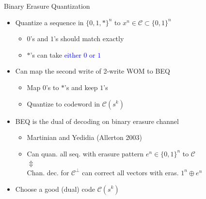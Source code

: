 \documentclass[10pt]{beamer}
\begin{document}
\begin{frame}{Binary Erasure Quantization}
  \begin{itemize}
  \item Quantize a sequence in $\{0,1,*\}^n$ to $x^n \in \mathcal{C} \subset \{0,1\}^n$
    \begin{itemize}
    \item $0$'s and $1$'s should \alert{match exactly}
    \item $*$'s can take \textcolor{blue}{either $0$ or $1$}
    \end{itemize}
    \vspace{0.25cm}
  \item Can map the second write of 2-write WOM to BEQ
    \begin{itemize}
    \item Map $0$'s to $*$'s and keep $1$'s
    \item Quantize to codeword in $\mathcal{C}(s^k)$
    \end{itemize}
\vspace{0.25cm}
  \item BEQ is the dual of decoding on binary erasure channel
    \begin{itemize}
    \item Martinian and Yedidia (Allerton 2003)
    \item Can quan. all seq. with erasure pattern $e^n \in \{0,1\}^n$ to $\mathcal{C}$ \\ \hspace{3.5cm} $\Updownarrow$ \\ Chan. dec. for $\mathcal{C}^{\perp}$ can correct all vectors with eras. $1^n \oplus e^n$
    \end{itemize}
    \vspace{0.25cm}
  \item Choose a good (dual) code $\mathcal{C}(s^k)$
  \end{itemize}
\end{frame}
\end{document}
